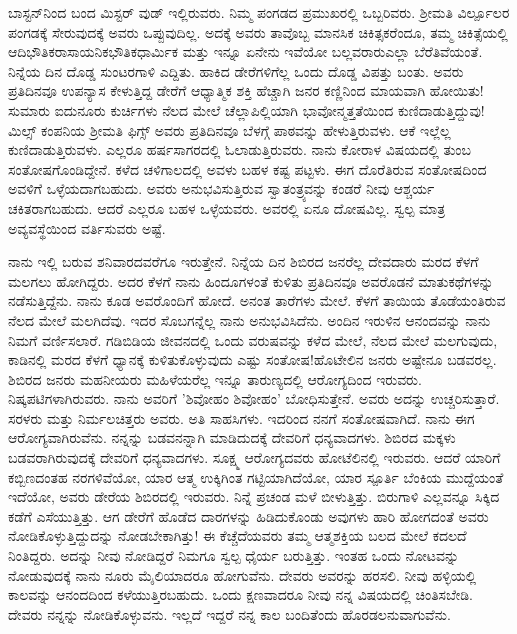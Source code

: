 ಬಾಸ್ಟನ್‌ನಿಂದ ಬಂದ ಮಿಸ್ಟರ್ ವುಡ್ ಇಲ್ಲಿರುವರು. ನಿಮ್ಮ ಪಂಗಡದ ಪ್ರಮುಖರಲ್ಲಿ ಒಬ್ಬರಿವರು. ಶ‍್ರೀಮತಿ ವಿ‌ರ್ಲ್ಪೂಲರ ಪಂಗಡಕ್ಕೆ ಸೇರುವುದಕ್ಕೆ ಅವರು ಒಪ್ಪುವುದಿಲ್ಲ. ಅದಕ್ಕೆ ಅವರು ತಾವೊಬ್ಬ ಮಾನಸಿಕ ಚಿಕಿತ್ಸಕರೆಂದೂ, ತಮ್ಮ ಚಿಕಿತ್ಸೆಯಲ್ಲಿ \enginline{-}ಆದಿಭೌತಿಕ\enginline{-}ರಾಸಾಯನಿಕ\enginline{-}ಭೌತಿಕ\enginline{-}ಧಾರ್ಮಿಕ ಮತ್ತು ಇನ್ನೂ ಏನೇನು ಇವೆಯೋ ಬಲ್ಲವರಾರು\enginline{-}ಎಲ್ಲಾ ಬೆರೆತಿವೆಯಂತೆ. ನಿನ್ನೆಯ ದಿನ ದೊಡ್ಡ ಸುಂಟರಗಾಳಿ ಎದ್ದಿತು. ಹಾಕಿದ ಡೇರೆಗಳಿಗೆಲ್ಲ ಒಂದು ದೊಡ್ಡ ವಿಪತ್ತು ಬಂತು. ಅವರು ಪ್ರತಿದಿನವೂ ಉಪನ್ಯಾಸ ಕೇಳುತ್ತಿದ್ದ ಡೇರೆಗೆ ಆಧ್ಯಾತ್ಮಿಕ ಶಕ್ತಿ ಹೆಚ್ಚಾಗಿ ಜನರ ಕಣ್ಣಿನಿಂದ ಮಾಯವಾಗಿ ಹೋಯಿತು! ಸುಮಾರು ಐದುನೂರು ಕುರ್ಚಿಗಳು ನೆಲದ ಮೇಲೆ ಚೆಲ್ಲಾಪಿಲ್ಲಿಯಾಗಿ ಭಾವೋನ್ಮತ್ತತೆಯಿಂದ ಕುಣಿದಾಡು\break ತ್ತಿದ್ದುವು! ಮಿಲ್ಸ್ ಕಂಪನಿಯ ಶ‍್ರೀಮತಿ ಫಿಗ್ಸ್ ಅವರು ಪ್ರತಿದಿನವೂ ಬೆಳಗ್ಗೆ ಪಾಠವನ್ನು ಹೇಳುತ್ತಿರುವಳು. ಆಕೆ ಇಲ್ಲೆಲ್ಲ ಕುಣಿದಾಡುತ್ತಿರುವಳು. ಎಲ್ಲರೂ ಹರ್ಷಸಾಗರದಲ್ಲಿ ಓಲಾಡುತ್ತಿರುವರು. ನಾನು ಕೋರಾಳ ವಿಷಯದಲ್ಲಿ ತುಂಬ ಸಂತೋಷಗೊಂಡಿದ್ದೇನೆ. ಕಳೆದ ಚಳಿಗಾಲದಲ್ಲಿ ಅವಳು ಬಹಳ ಕಷ್ಟ ಪಟ್ಟಳು. ಈಗ ದೊರೆತಿರುವ ಸಂತೋಷದಿಂದ ಅವಳಿಗೆ ಒಳ್ಳೆಯದಾಗಬಹುದು. ಅವರು ಅನುಭವಿಸುತ್ತಿರುವ ಸ್ವಾತಂತ್ರ್ಯವನ್ನು ಕಂಡರೆ ನೀವು ಆಶ್ಚರ್ಯ ಚಕಿತರಾಗಬಹುದು. ಆದರೆ ಎಲ್ಲರೂ ಬಹಳ ಒಳ್ಳೆಯವರು. ಅವರಲ್ಲಿ ಏನೂ ದೋಷವಿಲ್ಲ. ಸ್ವಲ್ಪ ಮಾತ್ರ ಅವ್ಯವಸ್ಥೆಯಿಂದ ವರ್ತಿಸುವರು ಅಷ್ಟೆ.

ನಾನು ಇಲ್ಲಿ ಬರುವ ಶನಿವಾರದವರೆಗೂ ಇರುತ್ತೇನೆ. ನಿನ್ನೆಯ ದಿನ ಶಿಬಿರದ ಜನರೆಲ್ಲ ದೇವದಾರು ಮರದ ಕೆಳಗೆ ಮಲಗಲು ಹೋಗಿದ್ದರು. ಅದರ ಕೆಳಗೆ ನಾನು ಹಿಂದೂಗಳಂತೆ ಕುಳಿತು ಪ್ರತಿದಿನವೂ ಅವರೊಡನೆ ಮಾತುಕಥೆಗಳನ್ನು ನಡೆಸುತ್ತಿದ್ದೆನು. ನಾನು ಕೂಡ ಅವರೊಂದಿಗೆ ಹೋದೆ. ಅನಂತ ತಾರೆಗಳು ಮೇಲೆ. ಕೆಳಗೆ ತಾಯಿಯ ತೊಡೆಯಂತಿರುವ ನೆಲದ ಮೇಲೆ ಮಲಗಿದೆವು. ಇದರ ಸೊಬಗನ್ನೆಲ್ಲ ನಾನು ಅನುಭವಿಸಿದೆನು. ಅಂದಿನ ಇರುಳಿನ ಆನಂದವನ್ನು ನಾನು ನಿಮಗೆ ವರ್ಣಿಸಲಾರೆ. ಗಡಿಬಿಡಿಯ ಜೀವನದಲ್ಲಿ ಒಂದು ವರುಷವನ್ನು ಕಳೆದ ಮೇಲೆ, ನೆಲದ ಮೇಲೆ ಮಲಗುವುದು, ಕಾಡಿನಲ್ಲಿ ಮರದ ಕೆಳಗೆ ಧ್ಯಾನಕ್ಕೆ ಕುಳಿತುಕೊಳ್ಳುವುದು ಎಷ್ಟು ಸಂತೋಷ!ಹೊಟೇಲಿನ ಜನರು ಅಷ್ಟೇನೂ ಬಡವರಲ್ಲ. ಶಿಬಿರದ ಜನರು \enginline{-} ಮಹನೀಯರು ಮಹಿಳೆಯರೆಲ್ಲ ಇನ್ನೂ ತಾರುಣ್ಯದಲ್ಲಿ ಆರೋಗ್ಯದಿಂದ ಇರುವರು. ನಿಷ್ಕಪಟಿಗಳಾಗಿರುವರು. ನಾನು ಅವರಿಗೆ ’ಶಿವೋಹಂ ಶಿವೋಹಂ’ ಬೋಧಿಸುತ್ತೇನೆ. ಅವರು ಅದನ್ನು ಉಚ್ಚರಿಸುತ್ತಾರೆ. ಸರಳರು ಮತ್ತು ನಿರ್ಮಲಚಿತ್ತರು ಅವರು. ಅತಿ ಸಾಹಸಿಗಳು. ಇದರಿಂದ ನನಗೆ ಸಂತೋಷವಾಗಿದೆ. ನಾನು ಈಗ ಆರೋಗ್ಯವಾಗಿರುವೆನು. ನನ್ನನ್ನು ಬಡವನನ್ನಾಗಿ ಮಾಡಿದುದಕ್ಕೆ ದೇವರಿಗೆ ಧನ್ಯವಾದಗಳು. ಶಿಬಿರದ ಮಕ್ಕಳು ಬಡವರಾಗಿರುವುದಕ್ಕೆ ದೇವರಿಗೆ ಧನ್ಯವಾದಗಳು. ಸೂಕ್ಷ್ಮ ಆರೋಗ್ಯದವರು ಹೋಟೆಲಿನಲ್ಲಿ ಇರುವರು. ಆದರೆ ಯಾರಿಗೆ ಕಬ್ಬಿಣದಂತಹ ನರಗಳಿವೆಯೋ, ಯಾರ ಆತ್ಮ ಉಕ್ಕಿಗಿಂತ ಗಟ್ಟಿಯಾಗಿದೆಯೋ, ಯಾರ ಸ್ಪೂರ್ತಿ ಬೆಂಕಿಯ ಮುದ್ದೆಯಂತೆ ಇದೆಯೋ, ಅವರು ಡೇರೆಯ ಶಿಬಿರದಲ್ಲಿ ಇರುವರು. ನಿನ್ನೆ ಪ್ರಚಂಡ ಮಳೆ ಬೀಳುತ್ತಿತ್ತು. ಬಿರುಗಾಳಿ ಎಲ್ಲವನ್ನೂ ಸಿಕ್ಕಿದ ಕಡೆಗೆ ಎಸೆಯುತ್ತಿತ್ತು. ಆಗ ಡೇರೆಗೆ ಹೊಡೆದ ದಾರಗಳನ್ನು ಹಿಡಿದುಕೊಂಡು ಅವುಗಳು ಹಾರಿ ಹೋಗದಂತೆ ಅವರು ನೋಡಿಕೊಳ್ಳುತ್ತಿದ್ದುದನ್ನು ನೋಡಬೇಕಾಗಿತ್ತು! ಈ ಕೆಚ್ಚೆದೆಯವರು ತಮ್ಮ ಆತ್ಮಶಕ್ತಿಯ ಬಲದ ಮೇಲೆ ಕದಲದೆ ನಿಂತಿದ್ದರು. ಅದನ್ನು ನೀವು ನೋಡಿದ್ದರೆ ನಿಮಗೂ ಸ್ವಲ್ಪ ಧೈರ್ಯ ಬರುತ್ತಿತ್ತು. ಇಂತಹ ಒಂದು ನೋಟವನ್ನು ನೋಡುವುದಕ್ಕೆ ನಾನು ನೂರು ಮೈಲಿಯಾದರೂ ಹೋಗುವೆನು. ದೇವರು ಅವರನ್ನು ಹರಸಲಿ. ನೀವು ಹಳ್ಳಿಯಲ್ಲಿ ಕಾಲವನ್ನು ಆನಂದದಿಂದ ಕಳೆಯುತ್ತಿರಬಹುದು. ಒಂದು ಕ್ಷಣವಾದರೂ ನೀವು ನನ್ನ ವಿಷಯದಲ್ಲಿ ಚಿಂತಿಸಬೇಡಿ. ದೇವರು ನನ್ನನ್ನು ನೋಡಿಕೊಳ್ಳುವನು. ಇಲ್ಲದೆ ಇದ್ದರೆ ನನ್ನ ಕಾಲ ಬಂದಿತೆಂದು ಹೊರಡಲನುವಾಗುವೆನು.

